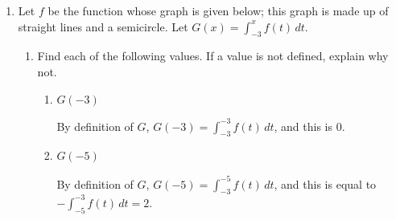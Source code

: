 \documentclass{article}
\begin{document}
\begin{enumerate}
\item
  \label{spring2004-spring2011-final-combined}

  {
    Let $f$ be the function whose graph is given below; this graph is made
    up of straight lines and a semicircle.  Let $G(x) = \displaystyle
    \int_{-3}^x f(t)\,dt$.

    \newsavebox{\graph}

    \begin{center}
      \usebox{\graph}
    \end{center}

    \begin{enumerate}
    \item \label{spring2004-spring2011-mb-final-combined-evaluate}
      Find each of the following values.  If a value is not defined,
      explain why not.

      \begin{enumerate}
      \item
        \begin{problem}[\vfill]
          $G(-3)$
        \end{problem}

        \begin{solution}
          By definition of $G$, $\displaystyle G(-3) = \int_{-3}^{-3}
          f(t)\,dt$, and this is $\boxed{0}$.
        \end{solution}

      \item
        \begin{problem}[\vfill]
          $G(-5)$
        \end{problem}

        \begin{solution}
          By definition of $G$, $\displaystyle G(-5) = \int_{-3}^{-5}
          f(t)\,dt$, and this is equal to $\displaystyle - \int_{-5}^{-3}
          f(t)\,dt = 2$.
        \end{solution}


\end{enumerate}
\end{enumerate}}
\end{enumerate}
\end{document}
